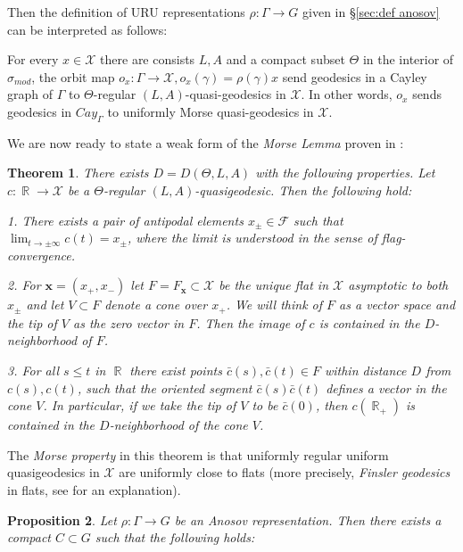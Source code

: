 \documentclass[12pt]{amsbook}%
\newtheorem{thm}{Theorem}[chapter]
\newtheorem{prop}[thm]{Proposition}
\theoremstyle{definition}
\theoremstyle{remark}
\numberwithin{section}{chapter}
\numberwithin{subsection}{section}
\numberwithin{figure}{chapter}
\DeclareMathOperator{\R}{\mathbb{R}}
\def\simod{\sigma_{mod}}
\def\cF{{\mathscr{F}}}
\def\cX{{\mathscr{X}}}
\def\bx{\mathbf{x}}
\def\Ga{\Gamma}
\def\ga{\gamma}
\begin{document}
{{Then the definition of URU representations $\rho: \Ga\to G$ given in \S \ref{sec:def anosov} can be interpreted as follows:

For every $x\in \cX$ there are consists $L, A$ and a compact subset $\Theta$ in the interior of $\simod$,  
 the orbit map $o_x: \Ga\to \cX, o_x(\ga)=\rho(\ga)x$  send geodesics in a Cayley graph of $\Ga$ to 
$\Theta$-regular $(L,A)$-quasi-geodesics in $\cX$.  In other words, $o_x$ sends geodesics in $Cay_\Ga$ to uniformly Morse quasi-geodesics in $\cX$. 

We are now ready to state a weak form of the {\em Morse Lemma} proven in \cite{KLP18}:

\begin{thm}\label{thm:Morse} 
There exists $D=D(\Theta, L,A)$ with the following properties. 
Let $c: \R\to \cX$ be a $\Theta$-regular $(L,A)$-quasigeodesic. Then the following hold:

1. There exists a pair of antipodal elements $x_\pm\in \cF$ such that $\lim_{t\to\pm \infty} c(t)=x_\pm$, where the limit is understood in the sense of flag-convergence. 

2. For $\bx=(x_+, x_-)$ let $F=F_{\bx}\subset \cX$ be the unique flat in $\cX$ asymptotic to both $x_\pm$ and let 
$V\subset F$ denote a cone over $x_+$. We will think of $F$ as a vector space and the tip of $V$ as the zero vector in $F$. 
Then the image of $c$ is contained in the $D$-neighborhood of $F$. 

3. For all $s\leqslant t$ in $\R$ there exist points $\bar{c}(s), \bar{c}(t)\in F$ within distance $D$ from $c(s), c(t)$, such that the oriented segment 
$\bar{c}(s) \bar{c}(t)$ defines a vector in the cone $V$. In particular, if we take the tip of $V$ to be $\bar{c}(0)$, then $c(\R_+)$ is contained in the $D$-neighborhood of the cone $V$. 
\end{thm}

The {\em Morse property} in this theorem is that uniformly regular uniform quasigeodesics in $\cX$ are uniformly close to flats (more precisely, 
{\em Finsler geodesics} in flats, see \cite{KLP18, Kapovich-Leeb-finsler} for an explanation). 




\begin{prop}\label{prop:Morse-prop}
Let $\rho: \Ga\to G$ be an Anosov representation. Then  there exists a compact $C\subset G$ such that the following holds:


\end{prop}}}
\end{document}
